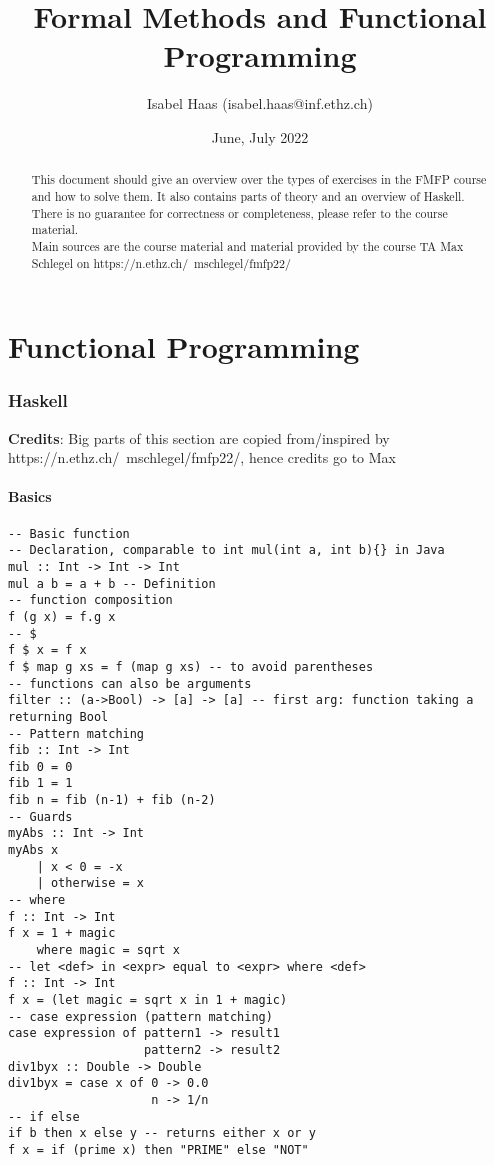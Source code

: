 \documentclass[11.5pt]{article}
\title{Formal Methods and Functional Programming}
\author{Isabel Haas (isabel.haas@inf.ethz.ch)}
\date{June, July 2022}
\begin{document}
\maketitle

\begin{abstract}
This document should give an overview over the types of exercises in the FMFP course and how to solve them. 
It also contains parts of theory and an overview of Haskell. \\
There is no guarantee for correctness or completeness, please refer to the course material. \\
Main sources are the course material and material provided by the course TA
Max Schlegel on https://n.ethz.ch/~mschlegel/fmfp22/
\end{abstract}

\thispagestyle{empty}
\tableofcontents

\newpage

\part*{Functional Programming}
\setcounter{section}{0}
\renewcommand*{\theHsection}{chX.\the\value{section}}

\section{Haskell}
\textbf{Credits}: Big parts of this section are copied from/inspired by https://n.ethz.ch/~mschlegel/fmfp22/, hence credits go to Max
\setcounter{page}{1}
\subsection{Basics}
\begin{verbatim}
-- Basic function
-- Declaration, comparable to int mul(int a, int b){} in Java
mul :: Int -> Int -> Int 
mul a b = a + b -- Definition
-- function composition
f (g x) = f.g x
-- $
f $ x = f x
f $ map g xs = f (map g xs) -- to avoid parentheses 
-- functions can also be arguments
filter :: (a->Bool) -> [a] -> [a] -- first arg: function taking a returning Bool
-- Pattern matching
fib :: Int -> Int
fib 0 = 0
fib 1 = 1
fib n = fib (n-1) + fib (n-2)
-- Guards
myAbs :: Int -> Int 
myAbs x
    | x < 0 = -x
    | otherwise = x
-- where 
f :: Int -> Int
f x = 1 + magic 
    where magic = sqrt x
-- let <def> in <expr> equal to <expr> where <def>
f :: Int -> Int
f x = (let magic = sqrt x in 1 + magic)
-- case expression (pattern matching)
case expression of pattern1 -> result1
                   pattern2 -> result2
div1byx :: Double -> Double
div1byx = case x of 0 -> 0.0
                    n -> 1/n
-- if else
if b then x else y -- returns either x or y
f x = if (prime x) then "PRIME" else "NOT" 
\end{verbatim}
\end{document}
